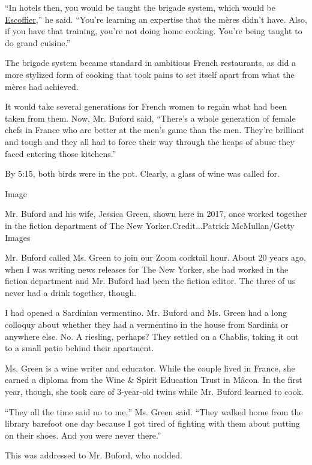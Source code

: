 ``In hotels then, you would be taught the brigade system, which would be
\href{https://www.nytimes.com/1961/04/16/archives/chef-of-chefs-he-was-escoffier-the-most-renowned-man-ever-to-wear-a.html}{Escoffier},''
he said. ``You're learning an expertise that the mères didn't have.
Also, if you have that training, you're not doing home cooking. You're
being taught to do grand cuisine.''

The brigade system became standard in ambitious French restaurants, as
did a more stylized form of cooking that took pains to set itself apart
from what the mères had achieved.

It would take several generations for French women to regain what had
been taken from them. Now, Mr. Buford said, ``There's a whole generation
of female chefs in France who are better at the men's game than the men.
They're brilliant and tough and they all had to force their way through
the heaps of abuse they faced entering those kitchens.''

By 5:15, both birds were in the pot. Clearly, a glass of wine was called
for.

Image

Mr. Buford and his wife, Jessica Green, shown here in 2017, once worked
together in the fiction department of The New Yorker.Credit...Patrick
McMullan/Getty Images

Mr. Buford called Ms. Green to join our Zoom cocktail hour. About 20
years ago, when I was writing news releases for The New Yorker, she had
worked in the fiction department and Mr. Buford had been the fiction
editor. The three of us never had a drink together, though.

I had opened a Sardinian vermentino. Mr. Buford and Ms. Green had a long
colloquy about whether they had a vermentino in the house from Sardinia
or anywhere else. No. A riesling, perhaps? They settled on a Chablis,
taking it out to a small patio behind their apartment.

Ms. Green is a wine writer and educator. While the couple lived in
France, she earned a diploma from the Wine \& Spirit Education Trust in
Mâcon. In the first year, though, she took care of 3-year-old twins
while Mr. Buford learned to cook.

``They all the time said no to me,'' Ms. Green said. ``They walked home
from the library barefoot one day because I got tired of fighting with
them about putting on their shoes. And you were never there.''

This was addressed to Mr. Buford, who nodded.


